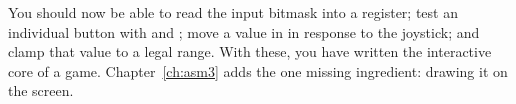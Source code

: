 \begin{prgcheck}
You should now be able to read the input bitmask into a register; test an
individual button with  and ; move a value in 
in response to the joystick; and clamp that value to a legal range. With these,
you have written the interactive core of a game. Chapter~\ref{ch:asm3} adds the
one missing ingredient: drawing it on the screen.
\end{prgcheck}
